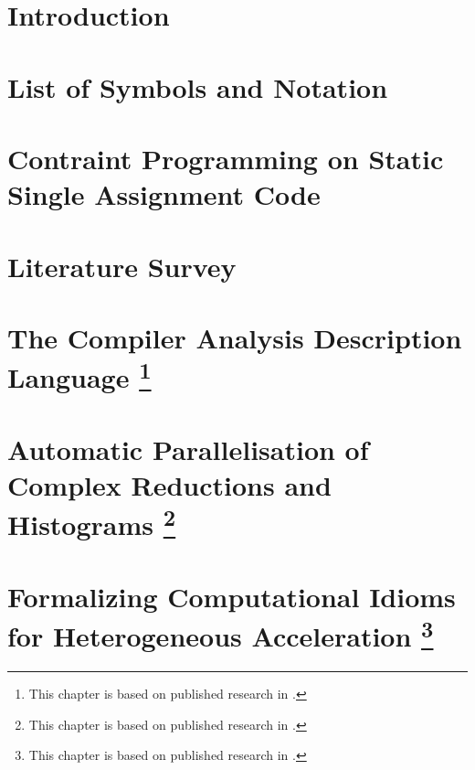 \documentclass[phd,icsa,twoside,logo,11pt]{infthesis}
\begin{document}
\chapter{Introduction}
    \label{chapter:introduction}
    

\makeatletter
\@openrightfalse
\makeatother
\chapter*{List of Symbols and Notation}
    
\makeatletter
\@openrighttrue
\makeatother

\chapter{Contraint Programming on Static Single Assignment Code}
    \label{chapter:theory}
    

\chapter{Literature Survey}
    \label{chapter:literature}
    

\chapter[Introducing the Compiler Analysis Description Language]
        {The Compiler Analysis Description Language
         \footnote{This chapter is based on published research in
                  \citet{Ginsbach:2018:CDS:3178372.3179515}.}}
    \label{chapter:candl}
    

\chapter[Automatic Parallelisation of Complex Reductions and Histograms]
        {Automatic Parallelisation of Complex Reductions and Histograms
         \footnote{This chapter is based on published research in
                   \citet{ginsbach2017discovery}.}}
    \label{chapter:reductions}
    

\chapter[Formalizing Computational Idioms for Heterogeneous Acceleration]
        {Formalizing Computational Idioms for Heterogeneous Acceleration
         \footnote{This chapter is based on published research in
                   \citet{Ginsbach:2018:AML:3173162.3173182}.}}
    \label{chapter:idioms}
    
\end{document}
